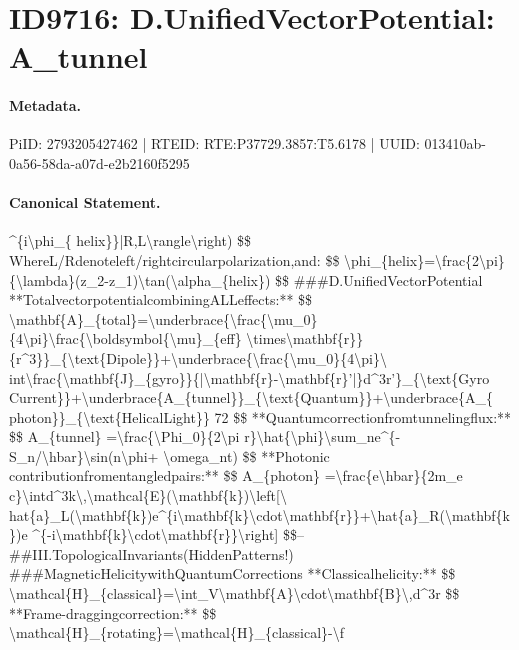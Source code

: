 \section*{ID9716: D.UnifiedVectorPotential: A\_tunnel}
\paragraph{Metadata.}
PiID: 2793205427462 | RTEID: RTE:P37729.3857:T5.6178 | UUID: 013410ab-0a56-58da-a07d-e2b2160f5295

\paragraph{Canonical Statement.}
\textasciicircum{}\{i\textbackslash{}phi\_\{ helix\}\}|R,L\textbackslash{}rangle\textbackslash{}right) \$\$ WhereL/Rdenoteleft/rightcircularpolarization,and: \$\$ \textbackslash{}phi\_\{helix\}=\textbackslash{}frac\{2\textbackslash{}pi\}\{\textbackslash{}lambda\}(z\_2-z\_1)\textbackslash{}tan(\textbackslash{}alpha\_\{helix\}) \$\$ \#\#\#D.UnifiedVectorPotential **TotalvectorpotentialcombiningALLeffects:** \$\$ \textbackslash{}mathbf\{A\}\_\{total\}=\textbackslash{}underbrace\{\textbackslash{}frac\{\textbackslash{}mu\_0\}\{4\textbackslash{}pi\}\textbackslash{}frac\{\textbackslash{}boldsymbol\{\textbackslash{}mu\}\_\{eff\} \textbackslash{}times\textbackslash{}mathbf\{r\}\}\{r\textasciicircum{}3\}\}\_\{\textbackslash{}text\{Dipole\}\}+\textbackslash{}underbrace\{\textbackslash{}frac\{\textbackslash{}mu\_0\}\{4\textbackslash{}pi\}\textbackslash{} int\textbackslash{}frac\{\textbackslash{}mathbf\{J\}\_\{gyro\}\}\{|\textbackslash{}mathbf\{r\}-\textbackslash{}mathbf\{r\}’|\}d\textasciicircum{}3r’\}\_\{\textbackslash{}text\{Gyro Current\}\}+\textbackslash{}underbrace\{A\_\{tunnel\}\}\_\{\textbackslash{}text\{Quantum\}\}+\textbackslash{}underbrace\{A\_\{ photon\}\}\_\{\textbackslash{}text\{HelicalLight\}\} 72 \$\$ **Quantumcorrectionfromtunnelingflux:** \$\$ A\_\{tunnel\} =\textbackslash{}frac\{\textbackslash{}Phi\_0\}\{2\textbackslash{}pi r\}\textbackslash{}hat\{\textbackslash{}phi\}\textbackslash{}sum\_ne\textasciicircum{}\{-S\_n/\textbackslash{}hbar\}\textbackslash{}sin(n\textbackslash{}phi+ \textbackslash{}omega\_nt) \$\$ **Photonic contributionfromentangledpairs:** \$\$ A\_\{photon\} =\textbackslash{}frac\{e\textbackslash{}hbar\}\{2m\_e c\}\textbackslash{}intd\textasciicircum{}3k\textbackslash{},\textbackslash{}mathcal\{E\}(\textbackslash{}mathbf\{k\})\textbackslash{}left[\textbackslash{} hat\{a\}\_L(\textbackslash{}mathbf\{k\})e\textasciicircum{}\{i\textbackslash{}mathbf\{k\}\textbackslash{}cdot\textbackslash{}mathbf\{r\}\}+\textbackslash{}hat\{a\}\_R(\textbackslash{}mathbf\{k\})e \textasciicircum{}\{-i\textbackslash{}mathbf\{k\}\textbackslash{}cdot\textbackslash{}mathbf\{r\}\}\textbackslash{}right] \$\$-- \#\#III.TopologicalInvariants(HiddenPatterns!) \#\#\#MagneticHelicitywithQuantumCorrections **Classicalhelicity:** \$\$ \textbackslash{}mathcal\{H\}\_\{classical\}=\textbackslash{}int\_V\textbackslash{}mathbf\{A\}\textbackslash{}cdot\textbackslash{}mathbf\{B\}\textbackslash{},d\textasciicircum{}3r \$\$ **Frame-draggingcorrection:** \$\$ \textbackslash{}mathcal\{H\}\_\{rotating\}=\textbackslash{}mathcal\{H\}\_\{classical\}-\textbackslash{}f

